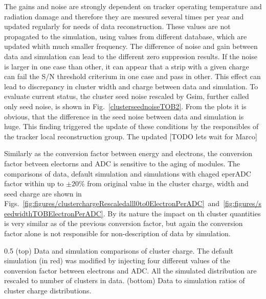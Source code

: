 The gains and noise are strongly dependent on tracker operating temperature and radiation damage and therefore they are mesured several times per year and updated regularly for needs of data reconstruction. These values are not propagated to the simulation, using values from different database, which are updated whith much smaller frequency. The difference of noise and gain between data and simulation can lead to the different zero suppresion results. If the noise is larger in one case than other, it can appear that a strip with a given charge can fail the S/N threshold criterium in one case and pass in other. This effect can lead to discrepancy in cluster width and charge between data and simulation. To evaluate current status, the cluster seed noise rescaled by Gsim, further called only seed noise, is shown in Fig.~\ref{clusterseednoiseTOB2}. From the plots it is obvious, that the difference in the seed noise between data and simulation is huge. This finding triggered the update of these conditions by the responsibles of the tracker local reconstruction group. The updated [TODO lets wait for Marco] 

Similarly as the conversion factor between energy and electrons, the conversion factor betveen electorns and ADC is sensitive to the aging of modules. The comparisons of data, default simulation and simulations with chaged eperADC factor within up to  $\pm 20\%$ from original value in the cluster charge, width and seed charge are shown in Figs.~\ref{fig:figures/clusterchargeRescaledalll0to0ElectronPerADC}~and~\ref{fig:figures/seedwidthTOBElectronPerADC}. By its nature the impact on th cluster quantities is very similar as of the previous conversion factor, but again the conversion factor alone is not responsible for non-description of data by simulation.  


                 {0.5}       %
                 { (top) Data and simulation comparisons of cluster charge. The default simulation (in red) was modified by injecting four different values of the conversion factor between electrons and ADC. All the simulated distribution are rescaled to number of clusters in data. (bottom) Data to simulation ratios of cluster charge distributions. }

